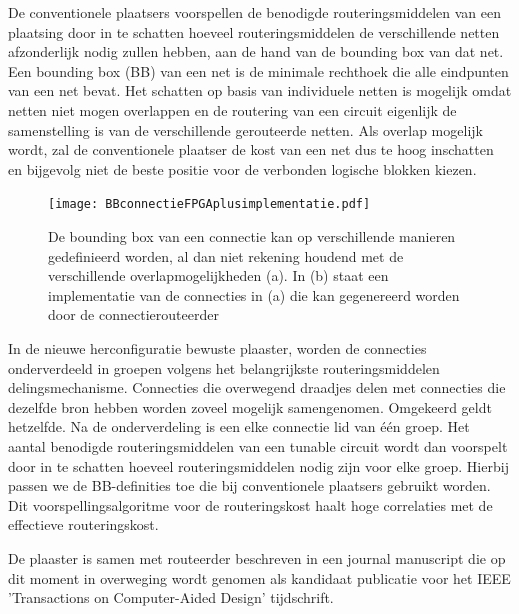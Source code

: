 \documentclass[a4paper,oneside,12pt]{article}
\begin{document}
De conventionele plaatsers voorspellen de benodigde routeringsmiddelen van een plaatsing door in te schatten hoeveel routeringsmiddelen de verschillende netten afzonderlijk nodig zullen hebben, aan de hand van de bounding box van dat net. Een bounding box (BB) van een net is de minimale rechthoek die alle eindpunten van een net bevat. Het schatten op basis van individuele netten is mogelijk omdat netten niet mogen overlappen en de routering van een circuit eigenlijk de samenstelling is van de verschillende gerouteerde netten. Als overlap mogelijk wordt, zal de conventionele plaatser de kost van een net dus te hoog inschatten en bijgevolg niet de beste positie voor de verbonden logische blokken kiezen. 

\begin{figure}
\centering
\texttt{[image: BBconnectieFPGAplusimplementatie.pdf]}
\caption{%
De bounding box van een connectie kan op verschillende manieren gedefinieerd worden, al dan niet rekening houdend met de verschillende overlapmogelijkheden (a). In (b) staat een implementatie van de connecties in (a) die kan gegenereerd worden door de connectierouteerder}
\label{BBconnectieFPGAplusimplementatie}
\end{figure}

In de nieuwe herconfiguratie bewuste plaaster, worden de connecties onderverdeeld in groepen volgens het belangrijkste routeringsmiddelen delingsmechanisme. Connecties die overwegend draadjes delen met connecties die dezelfde bron hebben worden zoveel mogelijk samengenomen. Omgekeerd geldt hetzelfde. Na de onderverdeling is een elke connectie lid van \'e\'en groep.
Het aantal benodigde routeringsmiddelen van een tunable circuit wordt dan voorspelt door in te schatten hoeveel routeringsmiddelen nodig zijn voor elke groep. Hierbij passen we de BB-definities toe die bij conventionele plaatsers gebruikt worden. Dit voorspellingsalgoritme voor de routeringskost haalt hoge correlaties met de effectieve routeringskost.

De plaaster is samen met routeerder beschreven in een journal manuscript die op dit moment in overweging wordt genomen als kandidaat publicatie voor het IEEE 'Transactions on Computer-Aided Design' tijdschrift. 

\newpage
\end{document}

